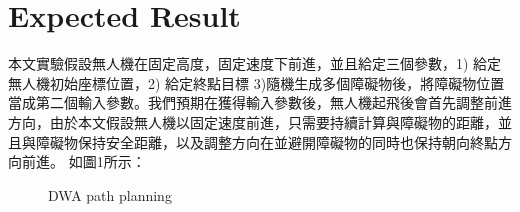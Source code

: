 \documentclass[crop=false]{standalone}
\begin{document}
	\section{Expected Result}
	本文實驗假設無人機在固定高度，固定速度下前進，並且給定三個參數，1) 給定無人機初始座標位置，2) 給定終點目標 3)隨機生成多個障礙物後，將障礙物位置當成第二個輸入參數。我們預期在獲得輸入參數後，無人機起飛後會首先調整前進方向，由於本文假設無人機以固定速度前進，只需要持續計算與障礙物的距離，並且與障礙物保持安全距離，以及調整方向在並避開障礙物的同時也保持朝向終點方向前進。 如圖1所示：
    
    \begin{figure}[!ht]	
    	\centering
    	
    	\quad
    	
    	\quad
    	
    	\quad
    	

    	
    	\caption{DWA path planning}
    	\label{fig:DWA path planning}
    \end{figure}
\end{document}
